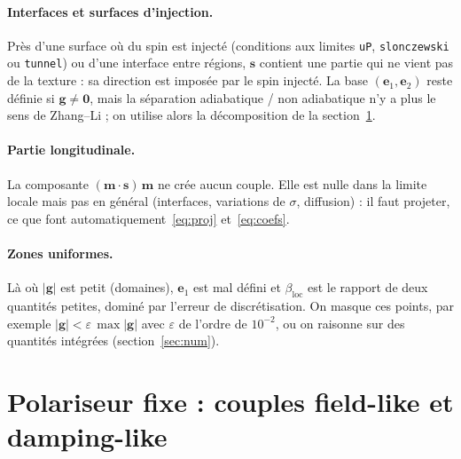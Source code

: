 \documentclass[11pt,a4paper]{article}
\newcommand{\vm}{\bm{m}}
\newcommand{\vs}{\bm{s}}
\newcommand{\vg}{\bm{g}}
\newcommand{\ve}{\bm{e}}
\newcommand{\code}[1]{\texttt{#1}}
\begin{document}
\paragraph{Interfaces et surfaces d'injection.} Près d'une surface où du spin est injecté
(conditions aux limites \code{uP}, \code{slonczewski} ou \code{tunnel}) ou d'une interface entre
régions, $\vs$ contient une partie qui ne vient pas de la texture : sa direction est imposée par
le spin injecté. La base $(\ve_1,\ve_2)$ reste définie si $\vg\neq\bm 0$, mais la séparation
adiabatique / non adiabatique n'y a plus le sens de Zhang--Li ; on utilise alors la décomposition
de la section~\ref{sec:polariseur}.

\paragraph{Partie longitudinale.} La composante $(\vm\cdot\vs)\,\vm$ ne crée aucun couple. Elle est
nulle dans la limite locale mais pas en général (interfaces, variations de $\sigma$, diffusion) :
il faut projeter, ce que font automatiquement~\eqref{eq:proj} et~\eqref{eq:coefs}.

\paragraph{Zones uniformes.} Là où $|\vg|$ est petit (domaines), $\ve_1$ est mal défini et
$\beta_{\text{loc}}$ est le rapport de deux quantités petites, dominé par l'erreur de
discrétisation. On masque ces points, par exemple $|\vg| < \varepsilon\,\max|\vg|$ avec
$\varepsilon$ de l'ordre de $10^{-2}$, ou on raisonne sur des quantités intégrées
(section~\ref{sec:num}).

\section{Polariseur fixe : couples field-like et damping-like}
\label{sec:polariseur}
\end{document}
